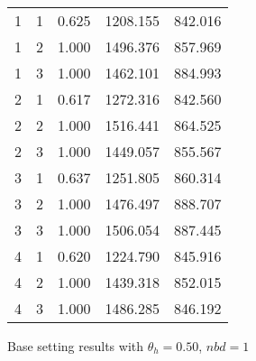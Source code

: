 \documentclass[11pt,a4paper,draft]{article}
\begin{document}
\begin{description}
\begin{figure}[!h]
\begin{tabular}{lllll}
			1 & 1 &  0.625 & 1208.155 & 842.016 \\
			1 & 2 &  1.000 & 1496.376 & 857.969 \\
			1 & 3 &  1.000 & 1462.101 & 884.993 \\
			\hline 
			2 & 1 &  0.617 & 1272.316 & 842.560 \\
			2 & 2 &  1.000 & 1516.441 & 864.525 \\
			2 & 3 &  1.000 & 1449.057 & 855.567 \\
			\hline 
			3 & 1 &  0.637 & 1251.805 & 860.314 \\
			3 & 2 &  1.000 & 1476.497 & 888.707 \\
			3 & 3 &  1.000 & 1506.054 & 887.445 \\
			\hline 
			4 & 1 &  0.620 & 1224.790 & 845.916 \\
			4 & 2 &  1.000 & 1439.318 & 852.015 \\
			4 & 3 &  1.000 & 1486.285 & 846.192 \\
			\hline 
			\hline 
		\end{tabular}
		\caption{Base setting results with $\theta_h = 0.50$, $nbd = 1$}
	\end{figure}


\end{description}
\end{document}
